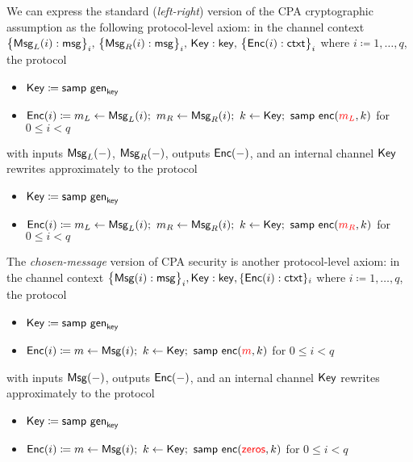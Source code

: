 We can express the standard (\emph{left-right}) version of the CPA cryptographic assumption as the following protocol-level axiom: in the channel context $\big\{\mathsf{Msg}_L(i) : \mathsf{msg}\big\}_i, \, \big\{\mathsf{Msg}_R(i) : \mathsf{msg}\big\}_i, \, \mathsf{Key} : \mathsf{key}, \, \big\{\mathsf{Enc}(i) : \mathsf{ctxt}\big\}_i$ where $i \coloneqq 1,\dots,q$, the protocol
\begin{itemize}
\item $\mathsf{Key} \coloneqq \mathsf{samp} \ \mathsf{gen}_{\mathsf{key}}$
\item $\Enc(i) \coloneqq m_L \leftarrow \MsgL(i); \ m_R \leftarrow \MsgR(i); \ k \leftarrow \Key; \ \samp{\enc({\color{red} m_L},k)}$ for $0 \leq i < q$
\end{itemize}
with inputs $\mathsf{Msg}_L(-)$, $\mathsf{Msg}_R(-)$, outputs $\mathsf{Enc}(-)$, and an internal channel $\mathsf{Key}$ rewrites approximately to the protocol
\begin{itemize}
\item $\mathsf{Key} \coloneqq \mathsf{samp} \ \mathsf{gen}_{\mathsf{key}}$
\item $\Enc(i) \coloneqq m_L \leftarrow \MsgL(i); \ m_R \leftarrow \MsgR(i); \ k \leftarrow \Key; \ \samp{\enc({\color{red} m_R},k)}$ for $0 \leq i < q$
\end{itemize}
The \emph{chosen-message} version of CPA security is another protocol-level axiom: in the channel context $\big\{\mathsf{Msg}(i) : \mathsf{msg}\big\}_i, \mathsf{Key} : \mathsf{key}, \{\mathsf{Enc}(i) : \mathsf{ctxt}\}_i$ where $i \coloneqq 1,\dots,q$, the protocol
\begin{itemize}
\item $\mathsf{Key} \coloneqq \mathsf{samp} \ \mathsf{gen}_{\mathsf{key}}$
\item $\mathsf{Enc}(i) \coloneqq m \leftarrow \mathsf{Msg}(i); \ k \leftarrow \mathsf{Key}; \ \mathsf{samp} \ \mathsf{enc}({\color{red} m},k)$ for $0 \leq i < q$
\end{itemize}
with inputs $\mathsf{Msg}(-)$, outputs $\mathsf{Enc}(-)$, and an internal channel $\mathsf{Key}$ rewrites approximately to the protocol
\begin{itemize}
\item $\mathsf{Key} \coloneqq \mathsf{samp} \ \mathsf{gen}_{\mathsf{key}}$
\item $\mathsf{Enc}(i) \coloneqq m \leftarrow \mathsf{Msg}(i); \ k \leftarrow \mathsf{Key}; \ \mathsf{samp} \ \mathsf{enc}{(\color{red} \mathsf{zeros}},k)$ for $0 \leq i < q$
\end{itemize}

